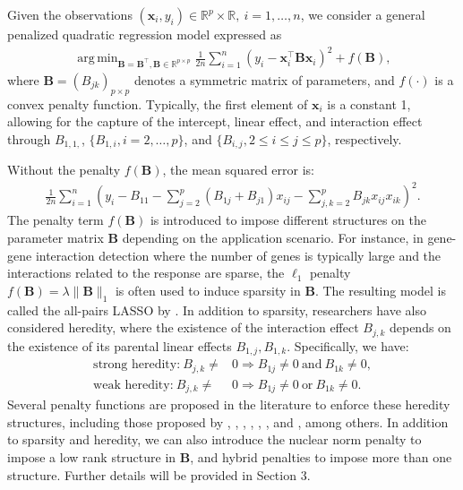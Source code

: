 \documentclass[preprint,authoryear,11pt]{elsarticle}
\def\mR{\mathbb{R}}
\newcommand{\B}{\mathbf B}
\newcommand{\x}{\mathbf x}
\newcommand{\trans}{^\top}
\DeclareMathOperator*{\argmin}{arg\,min} %
\begin{document}
 
  

Given the observations $(\x_i,y_i) \in \mR^{p}\times \mR,~i=1,\ldots,n$, we consider a general penalized quadratic regression model expressed as
\begin{align}\label{pqr}
	\argmin_{\B=\B^\top,  \B\in \mR^{p \times p}} \frac{1}{2n} \sum_{i=1}^n (y_i-\x_i\trans \B \x_i)^2+f(\B),
\end{align}
where $\B=(B_{jk})_{p \times p}$ denotes a symmetric matrix of parameters, and $f(\cdot)$ is a convex penalty function.  Typically, the first element of $\x_i$ is a constant 1, allowing for the capture of the intercept, linear effect, and interaction effect through $B_{1,1,}$, $\{B_{1,i}, i=2,\ldots, p\}$, and $\{B_{i,j}, 2\le i\le j \le p\}$, respectively.%

 

Without the penalty $f(\B)$, the mean squared error is: 
 \begin{align*}
\frac{1}{2n} \sum_{i=1}^n \left(y_i-B_{11}-\sum_{j=2}^p (B_{1j}+B_{j1})x_{ij}-\sum_{j,k=2}^p B_{jk} x_{ij}x_{ik} \right)^2.
\end{align*}
The penalty term $f(\B)$ is introduced to impose different structures on the parameter matrix $\B$ depending on the application scenario.  For instance, in gene-gene interaction detection where the number of genes is typically large and the interactions related to the response are sparse, the $\ell_1$ penalty $f(\B)=\lambda \|\B\|_1$ is often used to induce sparsity in $\B$.  The resulting model is called the all-pairs LASSO by \cite{bien2015convex}. 
 In addition to sparsity, researchers have also considered heredity, where the existence of the interaction effect $B_{j,k}$ depends on the existence of its parental linear effects $B_{1,j}, B_{1, k}$. Specifically, we have: 
\begin{align*}
\mbox{strong heredity:}~B_{j,k} \neq & 0 \Rightarrow B_{1j} \neq 0 ~\mbox{and}~ B_{1k} \neq 0,\\
\mbox{weak heredity:}~B_{j,k} \neq & 0 \Rightarrow B_{1j} \neq 0 ~\mbox{or}~ B_{1k} \neq 0.
\end{align*}
Several penalty functions are proposed in the literature to enforce these heredity structures, including those proposed by  \cite{yuan2009structured}, \cite{radchenko2010variable}, \cite{choi2010variable}, \cite{bien2013lasso}, \cite{lim2015learning}, \cite{haris2016convex}, and  \cite{she2017group}, among others.
 In addition to sparsity and heredity,  we can also introduce the  nuclear norm penalty  to impose a low rank structure in $\B$, and hybrid penalties to impose more than one structure.  Further details will  be provided in Section 3. 
  
\end{document}
